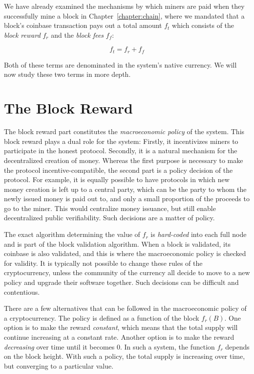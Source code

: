 We have already examined the mechanisms by which miners are paid when they
successfully mine a block in Chapter~\ref{chapter:chain}, where we mandated
that a block's coinbase transaction pays out a total amount $f_t$ which
consists of the \emph{block reward} $f_r$ and the \emph{block fees} $f_f$:

\[
    f_t = f_r + f_f
\]

Both of these terms are denominated in the system's native currency. We
will now study these two terms in more depth.

\section{The Block Reward}
The block reward part constitutes the \emph{macroeconomic policy} of the
system. This block reward plays a dual role for the system: Firstly, it
incentivizes miners to participate in the honest protocol. Secondly, it
is a natural mechanism for the decentralized creation of money. Whereas
the first purpose is necessary to make the protocol incentive-compatible,
the second part is a policy decision of the protocol. For example, it is
equally possible to have protocols in which new money creation is left up
to a central party, which can be the party to whom the newly issued money
is paid out to, and only a small proportion of the proceeds to go to the
miner. This would centralize money issuance, but still enable decentralized
public verifiability. Such decisions are a matter of policy.

The exact algorithm determining the value of $f_r$ is \emph{hard-coded}
into each full node and is part of the block validation algorithm. When
a block is validated, its coinbase is also validated, and this is where
the macroeconomic policy is checked for validity. It is typically not
possible to change these rules of the cryptocurrency, unless the community
of the currency all decide to move to a new policy and upgrade their software
together. Such decisions can be difficult and contentious.


There are a few alternatives that can be followed in the macroeconomic
policy of a cryptocurrency. The policy is defined as a function of the
block $f_r(B)$. One option is to make the reward \emph{constant}, which
means that the total supply will continue increasing at a constant rate.
Another option is to make the reward \emph{decreasing} over time until
it becomes $0$. In such a system, the function $f_r$ depends on the block
height. With such a policy, the total supply is increasing over time, but
converging to a particular value.

